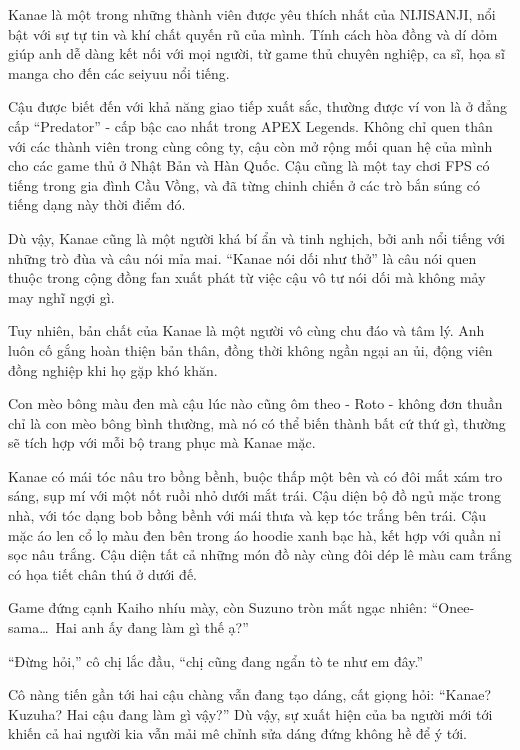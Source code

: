 \documentclass[../main.tex]{subfiles}
\begin{document}

Kanae là một trong những thành viên được yêu thích nhất của NIJISANJI, nổi bật với sự tự tin và khí chất quyến rũ của mình. Tính cách hòa đồng và dí dỏm giúp anh dễ dàng kết nối với mọi người, từ game thủ chuyên nghiệp, ca sĩ, họa sĩ manga cho đến các seiyuu nổi tiếng.

Cậu được biết đến với khả năng giao tiếp xuất sắc, thường được ví von là ở đẳng cấp ``Predator'' - cấp bậc cao nhất trong APEX Legends.  Không chỉ quen thân với các thành viên trong cùng công ty, cậu còn mở rộng mối quan hệ của mình cho các game thủ ở Nhật Bản và Hàn Quốc. Cậu cũng là một tay chơi FPS có tiếng trong gia đình Cầu Vồng, và đã từng chinh chiến ở các trò bắn súng có tiếng dạng này thời điểm đó.

Dù vậy, Kanae cũng là một người khá bí ẩn và tinh nghịch, bởi anh nổi tiếng với những trò đùa và câu nói mỉa mai. ``Kanae nói dối như thở'' là câu nói quen thuộc trong cộng đồng fan xuất phát từ việc cậu vô tư nói dối mà không mảy may nghĩ ngợi gì.

Tuy nhiên, bản chất của Kanae là một người vô cùng chu đáo và tâm lý. Anh luôn cố gắng hoàn thiện bản thân, đồng thời không ngần ngại an ủi, động viên đồng nghiệp khi họ gặp khó khăn.

Con mèo bông màu đen mà cậu lúc nào cũng ôm theo - Roto - không đơn thuần chỉ là con mèo bông bình thường, mà nó có thể biến thành bất cứ thứ gì, thường sẽ tích hợp với mỗi bộ trang phục mà Kanae mặc.

Kanae có mái tóc nâu tro bồng bềnh, buộc thấp một bên và có đôi mắt xám tro sáng, sụp mí với một nốt ruồi nhỏ dưới mắt trái. Cậu diện bộ đồ ngủ mặc trong nhà, với tóc dạng bob bồng bềnh với mái thưa và kẹp tóc trắng bên trái. Cậu mặc áo len cổ lọ màu đen bên trong áo hoodie xanh bạc hà, kết hợp với quần nỉ sọc nâu trắng. Cậu diện tất cả những món đồ này cùng đôi dép lê màu cam trắng có họa tiết chân thú ở dưới đế.

\chrint



Game đứng cạnh Kaiho nhíu mày, còn Suzuno tròn mắt ngạc nhiên: ``Onee-sama\dots\ Hai anh ấy đang làm gì thế ạ?''

``Đừng hỏi,'' cô chị lắc đầu, ``chị cũng đang ngẩn tò te như em đây.''

Cô nàng tiến gần tới hai cậu chàng vẫn đang tạo dáng, cất giọng hỏi: ``Kanae? Kuzuha? Hai cậu đang làm gì vậy?'' Dù vậy, sự xuất hiện của ba người mới tới khiến cả hai người kia vẫn mải mê chỉnh sửa dáng đứng không hề để ý tới.
\end{document}
